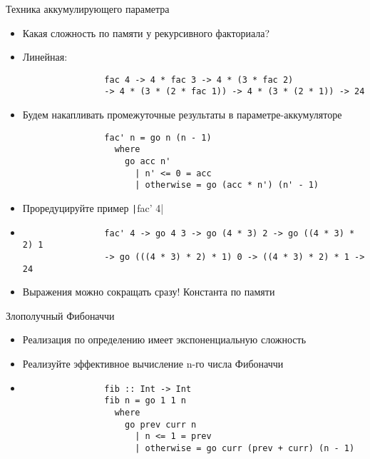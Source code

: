     \begin{frame}[fragile]{Техника аккумулирующего параметра}
        \begin{itemize}
            \item[\todo] Какая сложность по памяти у рекурсивного факториала?
            \item[\answer] \pause Линейная:
            \begin{verbatim}
                fac 4 -> 4 * fac 3 -> 4 * (3 * fac 2)
                -> 4 * (3 * (2 * fac 1)) -> 4 * (3 * (2 * 1)) -> 24
            \end{verbatim}
            \item Будем накапливать промежуточные результаты в параметре-аккумуляторе
            \begin{verbatim}
                fac' n = go n (n - 1)
                  where
                    go acc n'
                      | n' <= 0 = acc
                      | otherwise = go (acc * n') (n' - 1)
            \end{verbatim}
            \item[\todo] Проредуцируйте пример \texttt|fac' 4|
            \item[\answer] \pause
            \begin{verbatim}
                fac' 4 -> go 4 3 -> go (4 * 3) 2 -> go ((4 * 3) * 2) 1
                -> go (((4 * 3) * 2) * 1) 0 -> ((4 * 3) * 2) * 1 -> 24
            \end{verbatim}
            \item Выражения можно сокращать сразу! Константа по памяти
        \end{itemize}
    \end{frame}

    \begin{frame}[fragile]{Злополучный Фибоначчи}
        \begin{itemize}
            \item Реализация по определению имеет экспоненциальную сложность
            \item[\todo] Реализуйте эффективное вычисление n-го числа Фибоначчи
            \item[\answer] \pause
            \begin{verbatim}
                fib :: Int -> Int
                fib n = go 1 1 n
                  where
                    go prev curr n
                      | n <= 1 = prev
                      | otherwise = go curr (prev + curr) (n - 1)
            \end{verbatim}
        \end{itemize}
    \end{frame}


